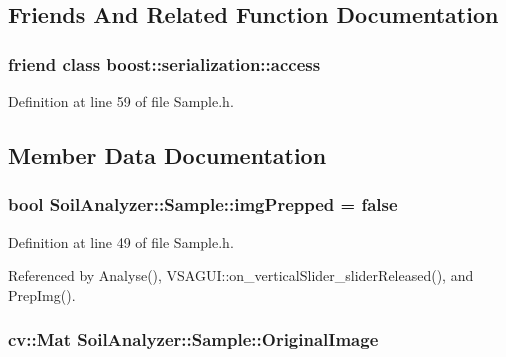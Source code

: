 \subsection{Friends And Related Function Documentation}
\hypertarget{class_soil_analyzer_1_1_sample_ac98d07dd8f7b70e16ccb9a01abf56b9c}{}
\subsubsection[{boost\+::serialization\+::access}]{\setlength{\rightskip}{0pt plus 5cm}friend class boost\+::serialization\+::access\hspace{0.3cm}{\ttfamily [friend]}}\label{class_soil_analyzer_1_1_sample_ac98d07dd8f7b70e16ccb9a01abf56b9c}


Definition at line 59 of file Sample.\+h.



\subsection{Member Data Documentation}
\hypertarget{class_soil_analyzer_1_1_sample_ab025a26f7276128a5a974cae15b51dfc}{}
\subsubsection[{img\+Prepped}]{\setlength{\rightskip}{0pt plus 5cm}bool Soil\+Analyzer\+::\+Sample\+::img\+Prepped = false}\label{class_soil_analyzer_1_1_sample_ab025a26f7276128a5a974cae15b51dfc}


Definition at line 49 of file Sample.\+h.



Referenced by Analyse(), V\+S\+A\+G\+U\+I\+::on\+\_\+vertical\+Slider\+\_\+slider\+Released(), and Prep\+Img().

\hypertarget{class_soil_analyzer_1_1_sample_a0d6e6fca9e232a77329daf0b4b29c634}{}
\subsubsection[{Original\+Image}]{\setlength{\rightskip}{0pt plus 5cm}cv\+::\+Mat Soil\+Analyzer\+::\+Sample\+::\+Original\+Image}\label{class_soil_analyzer_1_1_sample_a0d6e6fca9e232a77329daf0b4b29c634}


